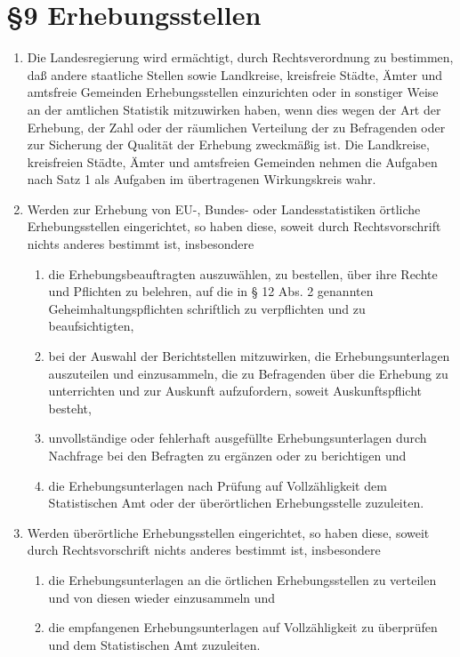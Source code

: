     \section{\S9 Erhebungsstellen}
        \begin{enumerate}[label=(\arabic*)]
            \item Die Landesregierung wird ermächtigt, durch Rechtsverordnung zu bestimmen, daß andere staatliche Stellen sowie Landkreise, kreisfreie Städte, Ämter und amtsfreie Gemeinden Erhebungsstellen einzurichten oder in sonstiger Weise an der amtlichen Statistik mitzuwirken haben, wenn dies wegen der Art der Erhebung, der Zahl oder der räumlichen Verteilung der zu Befragenden oder zur Sicherung der Qualität der Erhebung zweckmäßig ist. Die Landkreise, kreisfreien Städte, Ämter und amtsfreien Gemeinden nehmen die Aufgaben nach Satz 1 als Aufgaben im übertragenen Wirkungskreis wahr.
            \item Werden zur Erhebung von EU-, Bundes- oder Landesstatistiken örtliche Erhebungsstellen eingerichtet, so haben diese, soweit durch Rechtsvorschrift nichts anderes bestimmt ist, insbesondere
                \begin{enumerate}[label=\arabic*.]
                    \item die Erhebungsbeauftragten auszuwählen, zu bestellen, über ihre Rechte und Pflichten zu belehren, auf die in § 12 Abs. 2 genannten Geheimhaltungspflichten schriftlich zu verpflichten und zu beaufsichtigten,
                    \item bei der Auswahl der Berichtstellen mitzuwirken, die Erhebungsunterlagen auszuteilen und einzusammeln, die zu Befragenden über die Erhebung zu unterrichten und zur Auskunft aufzufordern, soweit Auskunftspflicht besteht,
                    \item unvollständige oder fehlerhaft ausgefüllte Erhebungsunterlagen durch Nachfrage bei den Befragten zu ergänzen oder zu berichtigen und
                    \item die Erhebungsunterlagen nach Prüfung auf Vollzähligkeit dem Statistischen Amt oder der überörtlichen Erhebungsstelle zuzuleiten.
                \end{enumerate}
            \item Werden überörtliche Erhebungsstellen eingerichtet, so haben diese, soweit durch Rechtsvorschrift nichts anderes bestimmt ist, insbesondere
                \begin{enumerate}[label=\arabic*.]
                    \item die Erhebungsunterlagen an die örtlichen Erhebungsstellen zu verteilen und von diesen wieder einzusammeln und
                    \item die empfangenen Erhebungsunterlagen auf Vollzähligkeit zu überprüfen und dem Statistischen Amt zuzuleiten.


\end{enumerate}
\end{enumerate}

